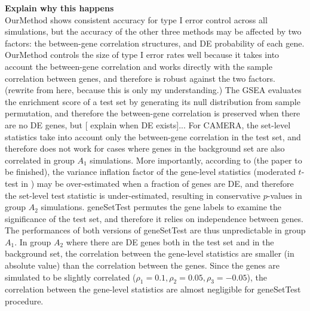 \documentclass[11pt, a4paper]{article}
\begin{document}
		 
		 \textbf{Explain why this happens}\\
		OurMethod shows consistent accuracy for type I error control across all simulations, but the accuracy of the other three methods may be affected by two factors: the between-gene correlation structures, and DE probability of each gene. OurMethod controls the size of type I error rates well because it takes into account the between-gene correlation and works directly with the sample correlation between genes, and therefore is robust against the two factors. (rewrite from here, because this is only my understanding.)  The GSEA evaluates the enrichment score of a test set by generating its null distribution from sample permutation, and therefore the between-gene correlation is preserved when there are no DE genes, but [ explain when DE exists]... 
		For CAMERA, the set-level statistics take into account only the between-gene correlation in the test set, and therefore does not work for cases where genes in the background set are also correlated in group $A_1$ simulations. More importantly, according to (the paper to be finished), the variance inflation factor of the gene-level statistics (moderated $t$-test in \cite{wu2012camera}) may be over-estimated when a fraction of genes are DE, and therefore the set-level test statistic is under-estimated, resulting in conservative $p$-values in group $A_2$ simulations. geneSetTest permutes the gene labels to examine the significance of the test set, and therefore it relies on independence between genes. The performances of both versions of geneSetTest are thus unpredictable in group $A_1$. In group $A_2$ where there are DE genes both in the test set and in the background set, the correlation between the gene-level statistics are smaller (in absolute value) than the correlation between the genes. Since the genes are simulated to be slightly correlated ($\rho_1=0.1, \rho_2 = 0.05, \rho_3 = -0.05$), the correlation between the gene-level statistics are almost negligible for geneSetTest procedure. 
			
\end{document}

